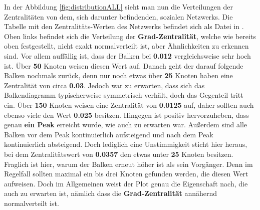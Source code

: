 In der Abbildung \ref{fig:distributionALL} sieht man nun die Verteilungen der Zentralitäten von dem, sich darunter befindenden, sozialen Netzwerks. Die Tabelle mit den Zentralitäts-Werten des Netzwerks befindet sich als Datei in \cite{TZ}. Oben links befindet sich die Verteilung der \textbf{Grad-Zentralität}, welche wie bereits oben festgestellt, nicht exakt normalverteilt ist, aber Ähnlichkeiten zu erkennen sind. Vor allem auffällig ist, dass der Balken bei \textbf{0.012} vergleichsweise sehr hoch ist. Über \textbf{50} Knoten weisen diesen Wert auf. Danach geht der darauf folgende Balken nochmals zurück, denn nur noch etwas über \textbf{25} Knoten haben eine Zentralität von circa \textbf{0.03}. Jedoch war zu erwarten, dass sich das Balkendiagramm typischerweise symmetrisch verhält, doch das Gegenteil tritt ein. Über \textbf{150} Knoten weisen eine Zentralität von \textbf{0.0125} auf, daher sollten auch ebenso viele den Wert \textbf{0.025} besitzen. Hingegen ist positiv hervorzuheben, dass genau \textbf{ein Peak} erreicht wurde, wie auch zu erwarten war. Außerdem sind alle Balken vor dem Peak kontinuierlich aufsteigend und nach dem Peak kontinuierlich absteigend. Doch lediglich eine Unstimmigkeit sticht hier heraus, bei dem Zentralitätswert von \textbf{0.0357} den etwas unter \textbf{25} Knoten besitzen. Fraglich ist hier, warum der Balken erneut höher ist als sein Vorgänger. Denn im Regelfall sollten maximal ein bis drei Knoten gefunden werden, die diesen Wert aufweisen. Doch im Allgemeinen weist der Plot genau die Eigenschaft nach, die auch zu erwarten ist, nämlich dass die \textbf{Grad-Zentralität} annähernd normalverteilt ist.\\

